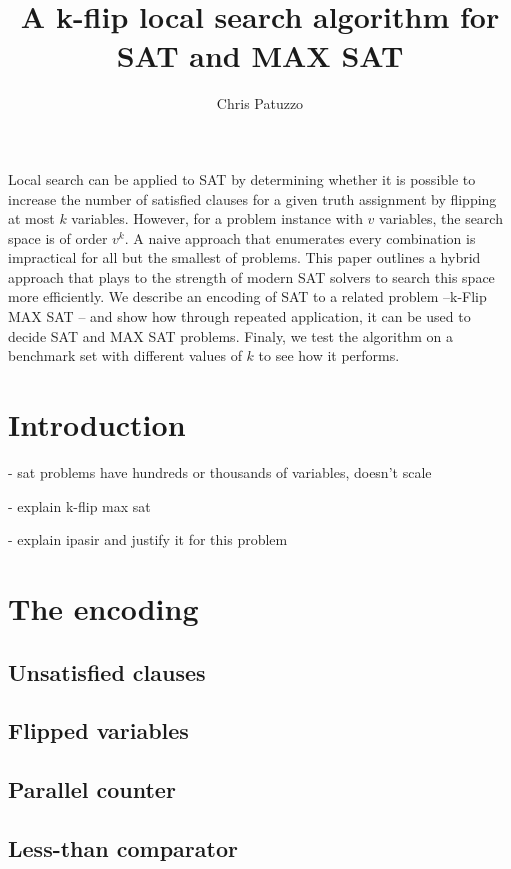 \documentclass{article}
\begin{document}
\title{A k-flip local search algorithm for SAT and MAX SAT}
\author{Chris Patuzzo}
\maketitle

\abstract
Local search can be applied to SAT by determining whether it is possible to
increase the number of satisfied clauses for a given truth assignment by
flipping at most $k$ variables. However, for a problem instance with $v$
variables, the search space is of order $v^k$. A naive approach that enumerates
every combination is impractical for all but the smallest of problems. This
paper outlines a hybrid approach that plays to the strength of modern SAT
solvers to search this space more efficiently. We describe an encoding of SAT
to a related problem –\linebreak k-Flip MAX SAT – and show how through repeated
application, it can be used to decide SAT and MAX SAT problems. Finaly, we test
the algorithm on a benchmark set with different values of $k$ to see how it
performs.

\section{Introduction}
- sat problems have hundreds or thousands of variables, doesn't scale

- explain k-flip max sat

- explain ipasir and justify it for this problem

\section{The encoding}

\subsection{Unsatisfied clauses}
\subsection{Flipped variables}
\subsection{Parallel counter}
\subsection{Less-than comparator}
\end{document}
